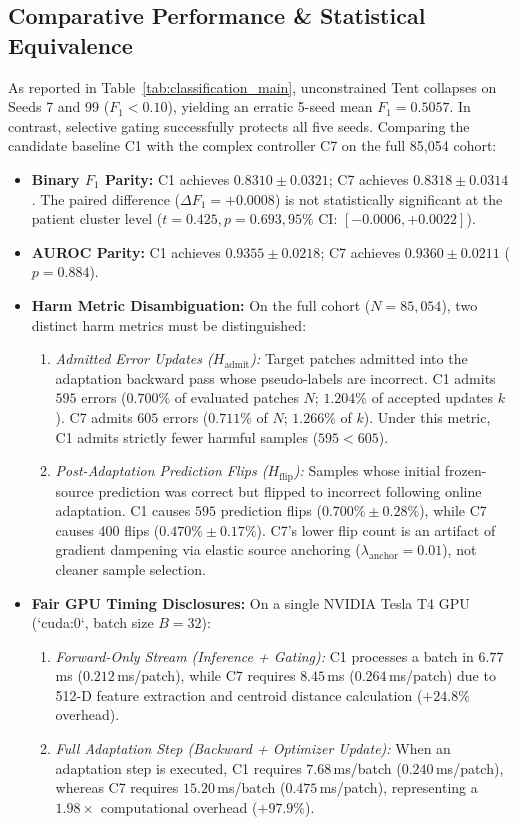 \documentclass[conference]{IEEEtran}
\begin{document}
\subsection{Comparative Performance \& Statistical Equivalence}
As reported in Table~\ref{tab:classification_main}, unconstrained Tent collapses on Seeds 7 and 99 ($F_1 < 0.10$), yielding an erratic 5-seed mean $F_1 = 0.5057$. In contrast, selective gating successfully protects all five seeds.
Comparing the candidate baseline C1 with the complex controller C7 on the full 85,054 cohort:
\begin{itemize}
    \item \textbf{Binary $F_1$ Parity:} C1 achieves $0.8310 \pm 0.0321$; C7 achieves $0.8318 \pm 0.0314$. The paired difference ($\Delta F_1 = +0.0008$) is not statistically significant at the patient cluster level ($t=0.425, p=0.693, 95\%\text{ CI: } [-0.0006, +0.0022]$).
    \item \textbf{AUROC Parity:} C1 achieves $0.9355 \pm 0.0218$; C7 achieves $0.9360 \pm 0.0211$ ($p=0.884$).
    \item \textbf{Harm Metric Disambiguation:} On the full cohort ($N=85{,}054$), two distinct harm metrics must be distinguished:
    \begin{enumerate}
        \item \textit{Admitted Error Updates ($H_{\text{admit}}$):} Target patches admitted into the adaptation backward pass whose pseudo-labels are incorrect. C1 admits $595$ errors ($0.700\%$ of evaluated patches $N$; $1.204\%$ of accepted updates $k$). C7 admits $605$ errors ($0.711\%$ of $N$; $1.266\%$ of $k$). Under this metric, C1 admits strictly fewer harmful samples ($595 < 605$).
        \item \textit{Post-Adaptation Prediction Flips ($H_{\text{flip}}$):} Samples whose initial frozen-source prediction was correct but flipped to incorrect following online adaptation. C1 causes $595$ prediction flips ($0.700\% \pm 0.28\%$), while C7 causes $400$ flips ($0.470\% \pm 0.17\%$). C7's lower flip count is an artifact of gradient dampening via elastic source anchoring ($\lambda_{\text{anchor}} = 0.01$), not cleaner sample selection.
    \end{enumerate}
    \item \textbf{Fair GPU Timing Disclosures:} On a single NVIDIA Tesla T4 GPU (`cuda:0`, batch size $B=32$):
    \begin{enumerate}
        \item \textit{Forward-Only Stream (Inference + Gating):} C1 processes a batch in $6.77$\,ms ($0.212$\,ms/patch), while C7 requires $8.45$\,ms ($0.264$\,ms/patch) due to 512-D feature extraction and centroid distance calculation ($+24.8\%$ overhead).
        \item \textit{Full Adaptation Step (Backward + Optimizer Update):} When an adaptation step is executed, C1 requires $7.68$\,ms/batch ($0.240$\,ms/patch), whereas C7 requires $15.20$\,ms/batch ($0.475$\,ms/patch), representing a $1.98\times$ computational overhead ($+97.9\%$).
    \end{enumerate}
\end{itemize}
\end{document}
